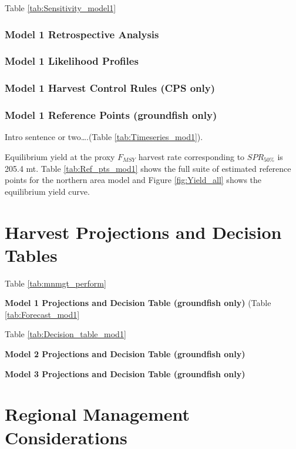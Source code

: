 \documentclass[12pt,]{article}
\begin{document}
Table \ref{tab:Sensitivity_model1}

\subsubsection{Model 1 Retrospective
Analysis}\label{model-1-retrospective-analysis}

\subsubsection{Model 1 Likelihood
Profiles}\label{model-1-likelihood-profiles}

\subsubsection{Model 1 Harvest Control Rules (CPS
only)}\label{model-1-harvest-control-rules-cps-only}

\subsubsection{Model 1 Reference Points (groundfish
only)}\label{model-1-reference-points-groundfish-only}

Intro sentence or two\ldots{}.(Table \ref{tab:Timeseries_mod1}).

Equilibrium yield at the proxy \(F_{MSY}\) harvest rate corresponding to
\(SPR_{50\%}\) is 205.4 mt. Table \ref{tab:Ref_pts_mod1} shows the full
suite of estimated reference points for the northern area model and
Figure \ref{fig:Yield_all} shows the equilibrium yield curve.

\section{Harvest Projections and Decision
Tables}\label{harvest-projections-and-decision-tables}

Table \ref{tab:mnmgt_perform}

\textbf{Model 1 Projections and Decision Table (groundfish only)} (Table
\ref{tab:Forecast_mod1}

Table \ref{tab:Decision_table_mod1}

\textbf{Model 2 Projections and Decision Table (groundfish only)}

\textbf{Model 3 Projections and Decision Table (groundfish only)}

\section{Regional Management
Considerations}\label{regional-management-considerations}
\end{document}
